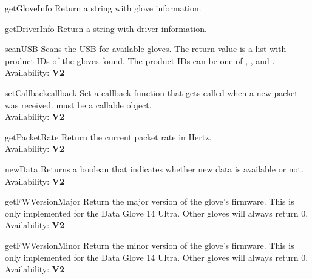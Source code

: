 \begin{methoddesc}{getGloveInfo}{}
Return a string with glove information.
\end{methoddesc}

\begin{methoddesc}{getDriverInfo}{}
Return a string with driver information.
\end{methoddesc}

\begin{methoddesc}{scanUSB}{}
Scans the USB for available gloves. The return value is a list with product
IDs of the gloves found. The product IDs can be one of , 
,  and .\\
Availability: {\bf V2}
\end{methoddesc}

\begin{methoddesc}{setCallback}{callback}
Set a callback function that gets called when a new packet was received.
 must be a callable object.\\
Availability: {\bf V2}
\end{methoddesc}

\begin{methoddesc}{getPacketRate}{}
Return the current packet rate in Hertz.\\
Availability: {\bf V2}
\end{methoddesc}

\begin{methoddesc}{newData}{}
Returns a boolean that indicates whether new data is available or not.\\
Availability: {\bf V2}
\end{methoddesc}

\begin{methoddesc}{getFWVersionMajor}{}
Return the major version of the glove's firmware. This is only implemented
for the Data Glove 14 Ultra. Other gloves will always return 0.\\
Availability: {\bf V2}
\end{methoddesc}

\begin{methoddesc}{getFWVersionMinor}{}
Return the minor version of the glove's firmware. This is only implemented
for the Data Glove 14 Ultra. Other gloves will always return 0.\\
Availability: {\bf V2}
\end{methoddesc}

